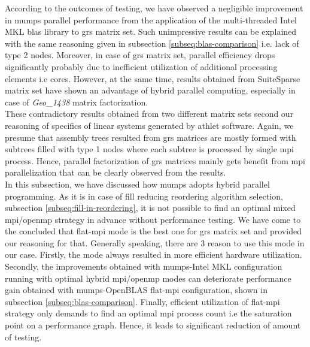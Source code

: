 According to the outcomes of testing, we have observed a negligible improvement in \gls{mumps} parallel performance from the application of the multi-threaded Intel MKL \gls{blas} library to \gls{grs} matrix set. Such unimpressive results can be explained with the same reasoning given in subsection \ref{subseq:blas-comparison} i.e. lack of type 2 nodes. Moreover, in case of \gls{grs} matrix set, parallel efficiency drops significantly probably due to inefficient utilization of additional processing elements i.e cores. However, at the same time, results obtained from SuiteSparse matrix set have shown an advantage of hybrid parallel computing, especially in case of \textit{Geo\_1438} matrix factorization.\\


These contradictory results obtained from two different matrix sets second our reasoning of specifics of linear systems generated by \gls{athlet} software. Again, we presume that assembly trees resulted from \gls{grs} matrices are mostly formed with subtrees filled with type 1 nodes where each subtree is processed by single \gls{mpi} process. Hence, parallel factorization of \gls{grs} matrices mainly gets benefit from \gls{mpi} parallelization that can be clearly observed from the results.\\



In this subsection, we have discussed how \gls{mumps} adopts hybrid parallel programming. As it is in case of fill reducing reordering algorithm selection, subsection \ref{subseq:fill-in-reordering}, it is not possible to find an optimal mixed \gls{mpi}/\gls{openmp} strategy in advance without performance testing. We have come to the concluded that flat-\gls{mpi} mode is the best one for \gls{grs} matrix set and provided our reasoning for that. Generally speaking, there are 3 reason to use this mode in our case. Firstly, the mode always resulted in more efficient hardware utilization. Secondly, the improvements obtained with \gls{mumps}-Intel MKL configuration running with optimal hybrid \gls{mpi}/\gls{openmp} modes can deteriorate performance gain obtained with \gls{mumps}-OpenBLAS flat-\gls{mpi} configuration, shown in subsection \ref{subseq:blas-comparison}. Finally, efficient utilization of flat-\gls{mpi} strategy only demands to find an optimal \gls{mpi} process count i.e the saturation point on a performance graph. Hence, it leads to significant reduction of amount of testing. \\
